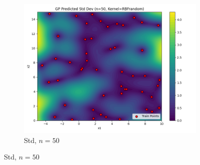 \documentclass[a4paper,12pt]{article}
\begin{document}
\begin{figure}[H]
\begin{subfigure}{0.3\textwidth}
    \includegraphics[width=\linewidth]{Task-02/images/gp_std_rbf_n50_random.png}
    \caption{Std, $n=50$}
\end{subfigure}


\end{figure}
\end{document}
